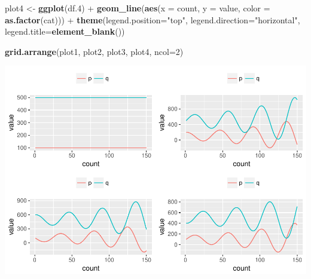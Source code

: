 \documentclass[]{article}
\newenvironment{Shaded}{\begin{snugshade}}{\end{snugshade}}
\newcommand{\KeywordTok}[1]{\textcolor[rgb]{0.13,0.29,0.53}{\textbf{{#1}}}}
\newcommand{\DataTypeTok}[1]{\textcolor[rgb]{0.13,0.29,0.53}{{#1}}}
\newcommand{\DecValTok}[1]{\textcolor[rgb]{0.00,0.00,0.81}{{#1}}}
\newcommand{\FloatTok}[1]{\textcolor[rgb]{0.00,0.00,0.81}{{#1}}}
\newcommand{\StringTok}[1]{\textcolor[rgb]{0.31,0.60,0.02}{{#1}}}
\newcommand{\NormalTok}[1]{{#1}}
\begin{document}
\begin{Shaded}
\begin{Highlighting}[]
\NormalTok{plot4 <-}\StringTok{ }\KeywordTok{ggplot}\NormalTok{(df}\FloatTok{.4}\NormalTok{) +}\StringTok{ }
\StringTok{         }\KeywordTok{geom_line}\NormalTok{(}\KeywordTok{aes}\NormalTok{(}\DataTypeTok{x =} \NormalTok{count, }\DataTypeTok{y =} \NormalTok{value, }\DataTypeTok{color =} \KeywordTok{as.factor}\NormalTok{(cat))) +}\StringTok{ }
\StringTok{         }\KeywordTok{theme}\NormalTok{(}\DataTypeTok{legend.position=}\StringTok{"top"}\NormalTok{, }\DataTypeTok{legend.direction=}\StringTok{"horizontal"}\NormalTok{, }\DataTypeTok{legend.title=}\KeywordTok{element_blank}\NormalTok{()) }

\KeywordTok{grid.arrange}\NormalTok{(plot1, plot2, plot3, plot4, }\DataTypeTok{ncol=}\DecValTok{2}\NormalTok{)}
\end{Highlighting}
\end{Shaded}

\includegraphics{CHunt_homework1_files/figure-latex/unnamed-chunk-6-1.pdf}
\end{document}

